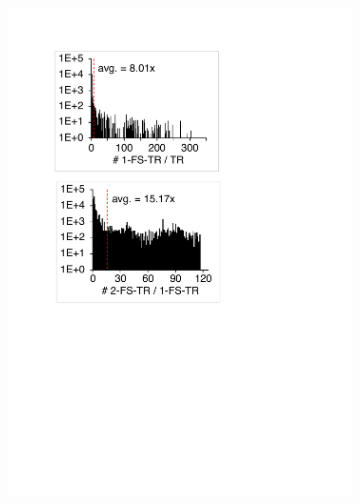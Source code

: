 \begin{figure}
  \centering
  \begin{subfigure}{0.24\textwidth}
    \centering
    \includegraphics[width=\textwidth]{img/1-fs-hist}
  \end{subfigure}
  \begin{subfigure}{0.24\textwidth}
    \centering

\end{subfigure}
\end{figure}
